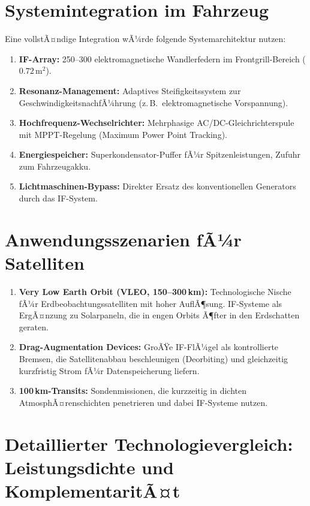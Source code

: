 ﻿\documentclass[12pt, a4paper]{report}
\theoremstyle{definition}
\theoremstyle{remark}
\begin{document}
\section{Systemintegration im Fahrzeug}

Eine vollstÃ¤ndige Integration wÃ¼rde folgende Systemarchitektur nutzen:

\begin{enumerate}[leftmargin=2em]
  \item \textbf{IF-Array:} 250--300 elektromagnetische Wandlerfedern im
        Frontgrill-Bereich ($0.72\,\text{m}^2$).
  \item \textbf{Resonanz-Management:} Adaptives Steifigkeitssystem zur
        GeschwindigkeitsnachfÃ¼hrung (z.\,B.\ elektromagnetische Vorspannung).
  \item \textbf{Hochfrequenz-Wechselrichter:} Mehrphasige AC/DC-Gleichrichterspule
        mit MPPT-Regelung (Maximum Power Point Tracking).
  \item \textbf{Energiespeicher:} Superkondensator-Puffer fÃ¼r Spitzenleistungen,
        Zufuhr zum Fahrzeugakku.
  \item \textbf{Lichtmaschinen-Bypass:} Direkter Ersatz des konventionellen
        Generators durch das IF-System.
\end{enumerate}

\section{Anwendungsszenarien fÃ¼r Satelliten}

\begin{enumerate}[leftmargin=2em]
  \item \textbf{Very Low Earth Orbit (VLEO, 150--300\,km):} Technologische
        Nische fÃ¼r Erdbeo\-bachtungs\-satelliten mit hoher AuflÃ¶sung. IF-Systeme
        als ErgÃ¤nzung zu Solarpaneln, die in engen Orbits Ã¶fter in den
        Erdschatten geraten.
  \item \textbf{Drag-Augmentation Devices:} GroÃŸe IF-FlÃ¼gel als kontrollierte
        Bremsen, die Satellitenabbau beschleunigen (Deorbiting) und gleichzeitig
        kurzfristig Strom fÃ¼r Datenspeicherung liefern.
  \item \textbf{100\,km-Transits:} Sondenmissionen, die kurzzeitig in dichten
        AtmosphÃ¤renschichten penetrieren und dabei IF-Systeme nutzen.
\end{enumerate}

\section{Detaillierter Technologievergleich: Leistungsdichte und KomplementaritÃ¤t}
\label{sec:vergleich_leistungsdichte}
\end{document}

